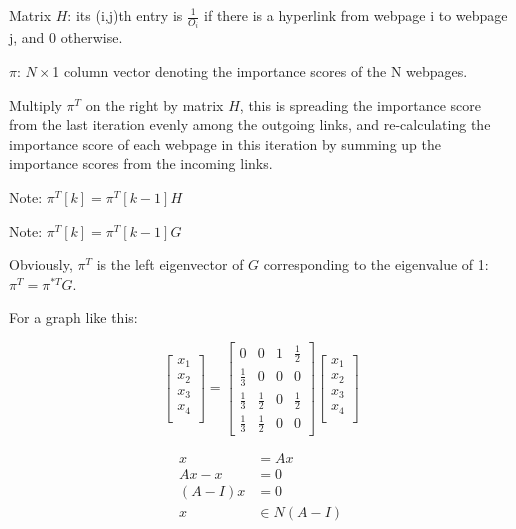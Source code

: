 Matrix $H$: its (i,j)th entry is $\frac{1}{O_i}$ if there is a hyperlink from webpage i to webpage j, and 0 otherwise.

$\pi$: $N \times$1 column vector denoting the importance scores of the N webpages.

Multiply $\pi^T$ on the right by matrix $H$, this is spreading the importance score from the last iteration evenly among the outgoing links, and re-calculating the importance score of each webpage in this iteration by summing up the importance scores from the incoming links.

Note: $\pi^T[k] = \pi^T[k - 1]H$



Note: $\pi^T[k] = \pi^T[k - 1]G$

Obviously, $\pi^{T}$ is the left eigenvector of $G$ corresponding to the eigenvalue of 1: $\pi^{T} = \pi^{*T}G$.

For a graph like this:

\begin{figure}
	\centering
	\resizebox{7.5cm}{3cm}{}
	\caption{}
	\label{}
\end{figure}


$$
\left[
\begin{matrix}
x_1 \\
x_2 \\
x_3\\
x_4\\
\end{matrix}
\right] =
\left[
\begin{matrix}
0 & 0 & 1 & \frac{1}{2} \\
\frac{1}{3} & 0 & 0& 0 \\
\frac{1}{3}& \frac{1}{2} & 0 & \frac{1}{2} \\
\frac{1}{3} & \frac{1}{2} & 0 & 0 
\end{matrix}
\right]
\left[
\begin{matrix}
x_1 \\
x_2 \\
x_3\\
x_4\\
\end{matrix}
\right]
$$

\begin{align*}
x &= Ax \\
Ax - x &= 0\\
(A - I)x &= 0\\
x&\in N(A-I)
\end{align*}


